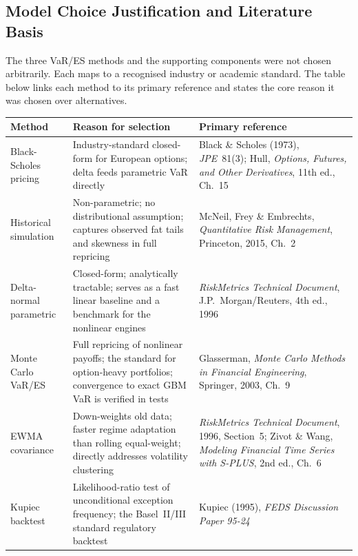 \documentclass[11pt]{article}
\begin{document}
\subsection{Model Choice Justification and Literature Basis}
\label{sec:model-justification}

The three VaR/ES methods and the supporting components were not chosen
arbitrarily.  Each maps to a recognised industry or academic standard.
The table below links each method to its primary reference and states
the core reason it was chosen over alternatives.

\begin{center}
\footnotesize
\begin{tabular}{L{2.6cm}L{4.5cm}L{5.8cm}}
\toprule
\textbf{Method} & \textbf{Reason for selection} & \textbf{Primary reference} \\
\midrule
Black-Scholes pricing
  & Industry-standard closed-form for European options; delta feeds
    parametric VaR directly
  & Black \& Scholes (1973), \textit{JPE}~81(3);
    Hull, \textit{Options, Futures, and Other Derivatives}, 11th ed., Ch.~15 \\[4pt]
Historical simulation
  & Non-parametric; no distributional assumption; captures observed fat
    tails and skewness in full repricing
  & McNeil, Frey \& Embrechts, \textit{Quantitative Risk Management},
    Princeton, 2015, Ch.~2 \\[4pt]
Delta-normal parametric
  & Closed-form; analytically tractable; serves as a fast linear baseline
    and a benchmark for the nonlinear engines
  & \textit{RiskMetrics Technical Document}, J.P.~Morgan/Reuters, 4th ed., 1996 \\[4pt]
Monte Carlo VaR/ES
  & Full repricing of nonlinear payoffs; the standard for option-heavy
    portfolios; convergence to exact GBM VaR is verified in tests
  & Glasserman, \textit{Monte Carlo Methods in Financial Engineering},
    Springer, 2003, Ch.~9 \\[4pt]
EWMA covariance
  & Down-weights old data; faster regime adaptation than rolling
    equal-weight; directly addresses volatility clustering
  & \textit{RiskMetrics Technical Document}, 1996, Section~5;
    Zivot \& Wang, \textit{Modeling Financial Time Series with S-PLUS},
    2nd ed., Ch.~6 \\[4pt]
Kupiec backtest
  & Likelihood-ratio test of unconditional exception frequency; the
    Basel~II/III standard regulatory backtest
  & Kupiec (1995), \textit{FEDS Discussion Paper 95-24} \\[4pt]

\end{tabular}
\end{center}
\end{document}
